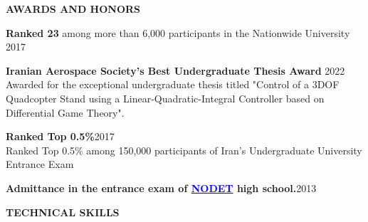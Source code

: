 \documentclass[12pt]{article}
\begin{document}
\vspace{0.2in} %


\begin{center}
	{\noindent \bfseries AWARDS AND HONORS}
\end{center}

 
\vspace{8pt} %


\noindent
{\bfseries Ranked 23} 
among more than 6,000 participants in the Nationwide University
\hfill 2017 \\
\vspace{12pt}

\noindent
{\bfseries Iranian Aerospace Society's Best Undergraduate Thesis Award} 
\hfill 2022 \vspace{6pt} \\
Awarded for the exceptional
undergraduate thesis titled "Control of a 3DOF Quadcopter Stand using a Linear-Quadratic-Integral Controller 
based on Differential Game Theory".

\vspace{12pt}
\noindent
{\bfseries Ranked Top 0.5\%}\hfill 2017 \vspace{6pt} \\ 
Ranked Top 0.5\% among 150,000 participants of Iran's Undergraduate University Entrance Exam

\vspace{12pt}
\noindent
{\bfseries Admittance in the entrance exam of {\href{https://en.wikipedia.org/wiki/National_Organization_for_Development_of_Exceptional_Talents}{\textcolor{blue}{NODET}}} high school.}\hfill 2013 \\ 



\vspace{0.2in} %



\begin{center}
	{\noindent \bfseries TECHNICAL SKILLS}
\end{center}

\end{document}
